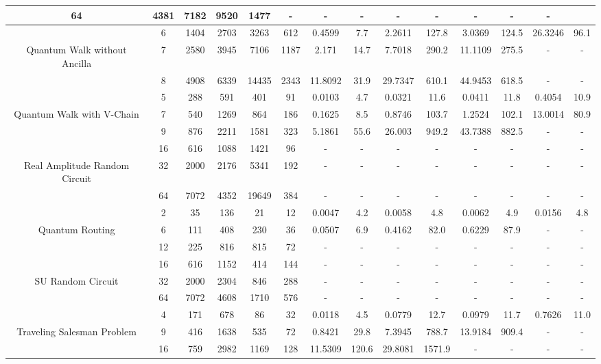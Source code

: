 \begin{table}[htb]
{\begin{tabular}{|c|c|c|c|c|c|c|c|c|c|c|c|c|c|}
64 & 4381 & 7182 & 9520 & 1477
 & - & -
 & - & -
 & - & -
 & - & -
 \\
\hline
 & 
6 & 1404 & 2703 & 3263 & 612
 & 0.4599 & 7.7
 & 2.2611 & 127.8
 & 3.0369 & 124.5
 & 26.3246 & 96.1
 \\
Quantum Walk without Ancilla & 
7 & 2580 & 3945 & 7106 & 1187
 & 2.171 & 14.7
 & 7.7018 & 290.2
 & 11.1109 & 275.5
 & - & -
 \\
 & 
8 & 4908 & 6339 & 14435 & 2343
 & 11.8092 & 31.9
 & 29.7347 & 610.1
 & 44.9453 & 618.5
 & - & -
 \\
\hline
 & 
5 & 288 & 591 & 401 & 91
 & 0.0103 & 4.7
 & 0.0321 & 11.6
 & 0.0411 & 11.8
 & 0.4054 & 10.9
 \\
Quantum Walk with V-Chain & 
7 & 540 & 1269 & 864 & 186
 & 0.1625 & 8.5
 & 0.8746 & 103.7
 & 1.2524 & 102.1
 & 13.0014 & 80.9
 \\
 & 
9 & 876 & 2211 & 1581 & 323
 & 5.1861 & 55.6
 & 26.003 & 949.2
 & 43.7388 & 882.5
 & - & -
 \\
\hline
 & 
16 & 616 & 1088 & 1421 & 96
 & - & -
 & - & -
 & - & -
 & - & -
 \\
Real Amplitude Random Circuit & 
32 & 2000 & 2176 & 5341 & 192
 & - & -
 & - & -
 & - & -
 & - & -
 \\
 & 
64 & 7072 & 4352 & 19649 & 384
 & - & -
 & - & -
 & - & -
 & - & -
 \\
\hline
 & 
2 & 35 & 136 & 21 & 12
 & 0.0047 & 4.2
 & 0.0058 & 4.8
 & 0.0062 & 4.9
 & 0.0156 & 4.8
 \\
Quantum Routing & 
6 & 111 & 408 & 230 & 36
 & 0.0507 & 6.9
 & 0.4162 & 82.0
 & 0.6229 & 87.9
 & - & -
 \\
 & 
12 & 225 & 816 & 815 & 72
 & - & -
 & - & -
 & - & -
 & - & -
 \\
\hline
 & 
16 & 616 & 1152 & 414 & 144
 & - & -
 & - & -
 & - & -
 & - & -
 \\
SU Random Circuit & 
32 & 2000 & 2304 & 846 & 288
 & - & -
 & - & -
 & - & -
 & - & -
 \\
 & 
64 & 7072 & 4608 & 1710 & 576
 & - & -
 & - & -
 & - & -
 & - & -
 \\
\hline
 & 
4 & 171 & 678 & 86 & 32
 & 0.0118 & 4.5
 & 0.0779 & 12.7
 & 0.0979 & 11.7
 & 0.7626 & 11.0
 \\
Traveling Salesman Problem & 
9 & 416 & 1638 & 535 & 72
 & 0.8421 & 29.8
 & 7.3945 & 788.7
 & 13.9184 & 909.4
 & - & -
 \\
 & 
16 & 759 & 2982 & 1169 & 128
 & 11.5309 & 120.6
 & 29.8081 & 1571.9
 & - & -
 & - & -
 \\

\end{tabular}}
\end{table}
